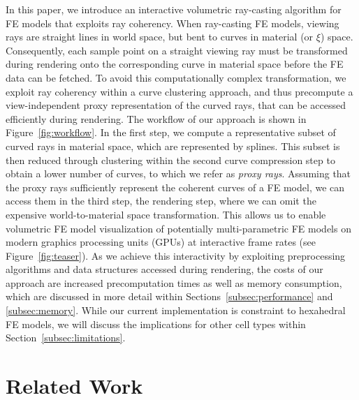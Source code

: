 \documentclass[journal]{vgtc}                %
\begin{document}
In this paper, we introduce an interactive volumetric ray-casting algorithm for FE models that exploits ray coherency. When ray-casting FE models, viewing rays are straight lines in world space, but bent to curves in material (or $\xi$) space. Consequently, each sample point on a straight viewing ray must be transformed during rendering onto the corresponding curve in material space before the FE data can be fetched. To avoid this computationally complex transformation, we exploit ray coherency within a curve clustering approach, and thus precompute a view-independent proxy representation of the curved rays, that can be accessed efficiently during rendering. The workflow of our approach is shown in Figure~\ref{fig:workflow}. In the first step, we compute a representative subset of curved rays in material space, which are represented by splines. This subset is then reduced through clustering within the second curve compression step to obtain a lower number of curves, to which we refer as \emph{proxy rays}. Assuming that the proxy rays sufficiently represent the coherent curves of a FE model, we can access them in the third step, the rendering step, where we can omit the expensive world-to-material space transformation. This allows us to enable volumetric FE model visualization of potentially multi-parametric FE models on modern graphics processing units (GPUs) at interactive frame rates (see Figure~\ref{fig:teaser}). As we achieve this interactivity by exploiting preprocessing algorithms and data structures accessed during rendering, the costs of our approach are increased precomputation times as well as memory consumption, which are discussed in more detail within Sections~\ref{subsec:performance} and \ref{subsec:memory}. While our current implementation is constraint to hexahedral FE models, we will discuss the implications for other cell types within Section~\ref{subsec:limitations}.
%
%
%
\section{Related Work}\label{sec:relatedwork}
\end{document}

